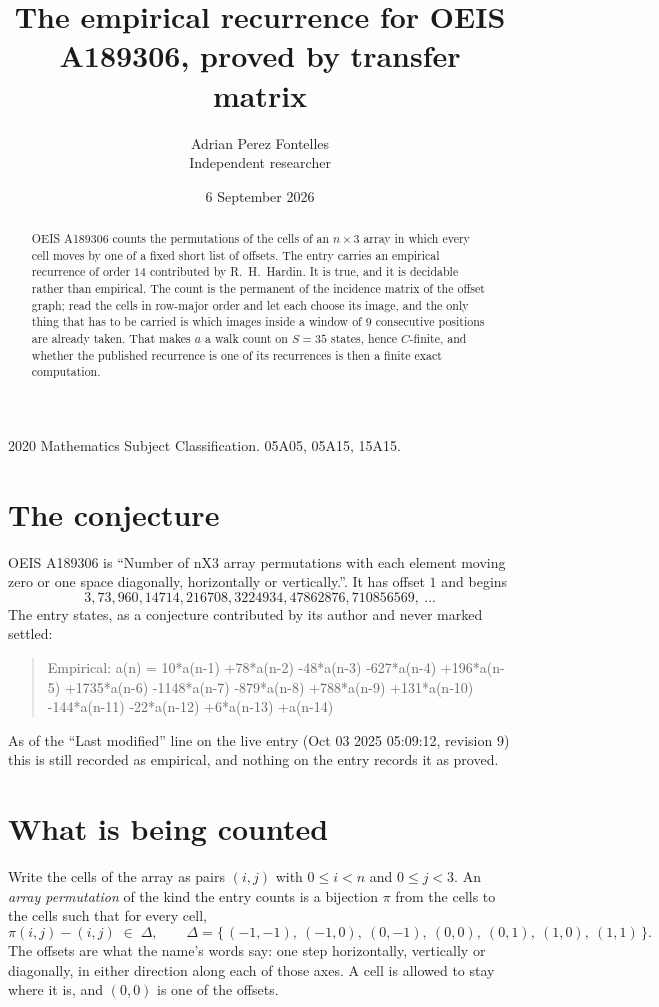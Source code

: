 \documentclass[11pt,a4paper]{article}
\title{The empirical recurrence for OEIS A189306, proved by transfer matrix}
\author{Adrian Perez Fontelles\\ \small Independent researcher}
\date{6 September 2026}
\theoremstyle{plain}
\theoremstyle{definition}
\begin{document}
\maketitle

\begin{abstract}
OEIS A189306 counts the permutations of the cells of an $n\times3$ array in which every cell
moves by one of a fixed short list of offsets. The entry carries an empirical recurrence of
order $14$ contributed by R.~H.~Hardin. It is true, and it is decidable rather than
empirical. The count is the permanent of the incidence matrix of the offset graph; read the
cells in row-major order and let each choose its image, and the only thing that has to be
carried is which images inside a window of $9$ consecutive positions are already taken.
That makes $a$ a walk count on $S=35$ states, hence $C$-finite, and whether the published
recurrence is one of its recurrences is then a finite exact computation.
\end{abstract}

\noindent\small 2020 Mathematics Subject Classification. 05A05, 05A15, 15A15.\normalsize

\section{The conjecture}

OEIS A189306 is ``Number of nX3 array permutations with each element moving zero or one space diagonally, horizontally or vertically.''. It has offset $1$ and begins
\[
3, 73, 960, 14714, 216708, 3224934, 47862876, 710856569,\ \dots
\]
The entry states, as a conjecture contributed by its author and never marked settled:
\begin{quote}
Empirical: a(n) = 10*a(n-1) +78*a(n-2) -48*a(n-3) -627*a(n-4) +196*a(n-5) +1735*a(n-6) -1148*a(n-7) -879*a(n-8) +788*a(n-9) +131*a(n-10) -144*a(n-11) -22*a(n-12) +6*a(n-13) +a(n-14)
\end{quote}
As of the ``Last modified'' line on the live entry (Oct 03 2025 05:09:12, revision 9) this is still
recorded as empirical, and nothing on the entry records it as proved.

\section{What is being counted}

Write the cells of the array as pairs $(i,j)$ with $0\le i<n$ and $0\le j<3$. An
\emph{array permutation} of the kind the entry counts is a bijection $\pi$ from the cells to
the cells such that for every cell,
\[
\pi(i,j)-(i,j)\;\in\;\Delta,\qquad
\Delta=\{\,(-1,-1),\ (-1,0),\ (0,-1),\ (0,0),\ (0,1),\ (1,0),\ (1,1)\,\}.
\]
The offsets are what the name's words say: one step horizontally, vertically or diagonally, in either direction along each of those axes. A cell is allowed to stay where it is, and $(0,0)$ is one of the offsets.
\end{document}
